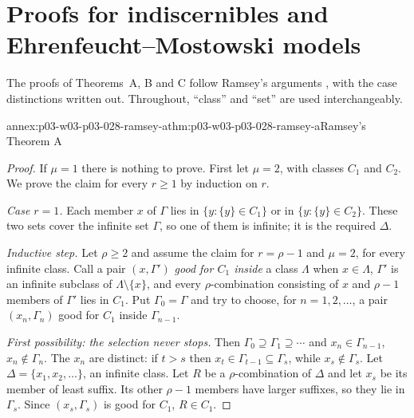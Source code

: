 \section{Proofs for indiscernibles and Ehrenfeucht--Mostowski models}
\label{sec:annex-p03-w03-p03-028}

The proofs of Theorems~A, B and C follow Ramsey's arguments
\cite[pp.~264--269]{Ramsey1930}, with the case distinctions written out.
Throughout, ``class'' and ``set'' are used interchangeably.

\begin{annexitem}{annex:p03-w03-p03-028-ramsey-a}{thm:p03-w03-p03-028-ramsey-a}{Ramsey's Theorem A}
\begin{proof}
If \(\mu=1\) there is nothing to prove.  First let \(\mu=2\), with classes
\(C_1\) and \(C_2\).  We prove the claim for every \(r\geq1\) by induction
on \(r\).

\emph{Case \(r=1\).}  Each member \(x\) of \(\Gamma\) lies in
\(\{y:\{y\}\in C_1\}\) or in \(\{y:\{y\}\in C_2\}\).  These two sets cover
the infinite set \(\Gamma\), so one of them is infinite; it is the required
\(\Delta\).

\emph{Inductive step.}  Let \(\rho\geq2\) and assume the claim for
\(r=\rho-1\) and \(\mu=2\), for every infinite class.  Call a pair
\((x,\Gamma')\) \emph{good for \(C_1\) inside} a class \(\Lambda\) when
\(x\in\Lambda\), \(\Gamma'\) is an infinite subclass of
\(\Lambda\setminus\{x\}\), and every \(\rho\)-combination consisting of
\(x\) and \(\rho-1\) members of \(\Gamma'\) lies in \(C_1\).  Put
\(\Gamma_0=\Gamma\) and try to choose, for \(n=1,2,\ldots\), a pair
\((x_n,\Gamma_n)\) good for \(C_1\) inside \(\Gamma_{n-1}\).

\emph{First possibility: the selection never stops.}  Then
\(\Gamma_0\supseteq\Gamma_1\supseteq\cdots\) and \(x_n\in\Gamma_{n-1}\),
\(x_n\notin\Gamma_n\).  The \(x_n\) are distinct: if \(t>s\) then
\(x_t\in\Gamma_{t-1}\subseteq\Gamma_s\), while \(x_s\notin\Gamma_s\).  Let
\(\Delta=\{x_1,x_2,\ldots\}\), an infinite class.  Let \(R\) be a
\(\rho\)-combination of \(\Delta\) and let \(x_s\) be its member of least
suffix.  Its other \(\rho-1\) members have larger suffixes, so they lie in
\(\Gamma_s\).  Since \((x_s,\Gamma_s)\) is good for \(C_1\), \(R\in C_1\).


\end{proof}
\end{annexitem}
